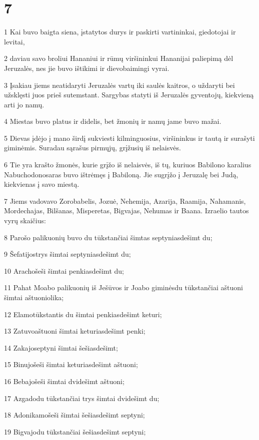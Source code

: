 \chapter{7}

\par 1 Kai buvo baigta siena, įstatytos durys ir paskirti vartininkai, giedotojai ir levitai, 
\par 2 daviau savo broliui Hananiui ir rūmų viršininkui Hananijai paliepimą dėl Jeruzalės, nes jie buvo ištikimi ir dievobaimingi vyrai. 
\par 3 Įsakiau jiems neatidaryti Jeruzalės vartų iki saulės kaitros, o uždaryti bei užsklęsti juos prieš sutemstant. Sargybas statyti iš Jeruzalės gyventojų, kiekvieną arti jo namų. 
\par 4 Miestas buvo platus ir didelis, bet žmonių ir namų jame buvo mažai. 
\par 5 Dievas įdėjo į mano širdį sukviesti kilminguosius, viršininkus ir tautą ir surašyti giminėmis. Suradau sąrašus pirmųjų, grįžusių iš nelaisvės. 
\par 6 Tie yra krašto žmonės, kurie grįžo iš nelaisvės, iš tų, kuriuos Babilono karalius Nabuchodonosaras buvo ištrėmęs į Babiloną. Jie sugrįžo į Jeruzalę bei Judą, kiekvienas į savo miestą. 
\par 7 Jiems vadovavo Zorobabelis, Jozuė, Nehemija, Azarija, Raamija, Nahamanis, Mordechajas, Bilšanas, Misperetas, Bigvajas, Nehumas ir Baana. Izraelio tautos vyrų skaičius: 
\par 8 Parošo palikuonių buvo du tūkstančiai šimtas septyniasdešimt du; 
\par 9 Šefatijos­trys šimtai septyniasdešimt du; 
\par 10 Aracho­šeši šimtai penkiasdešimt du; 
\par 11 Pahat Moabo palikuonių iš Ješūvos ir Joabo giminės­du tūkstančiai aštuoni šimtai aštuoniolika; 
\par 12 Elamo­tūkstantis du šimtai penkiasdešimt keturi; 
\par 13 Zatuvo­aštuoni šimtai keturiasdešimt penki; 
\par 14 Zakajo­septyni šimtai šešiasdešimt; 
\par 15 Binujo­šeši šimtai keturiasdešimt aštuoni; 
\par 16 Bebajo­šeši šimtai dvidešimt aštuoni; 
\par 17 Azgado­du tūkstančiai trys šimtai dvidešimt du; 
\par 18 Adonikamo­šeši šimtai šešiasdešimt septyni; 
\par 19 Bigvajo­du tūkstančiai šešiasdešimt septyni; 
